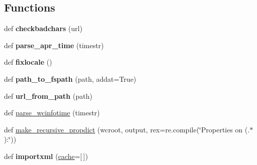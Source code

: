 \subsection*{Functions}
\begin{DoxyCompactItemize}
\item 
\mbox{\label{namespacepy_1_1__path_1_1svnwc_a85706a9a2cd6a80c8ab4f2474d1a0d15}} 
def {\bfseries checkbadchars} (url)
\item 
\mbox{\label{namespacepy_1_1__path_1_1svnwc_acaa85a1e6ef7d13c905de26eaeca9aae}} 
def {\bfseries parse\+\_\+apr\+\_\+time} (timestr)
\item 
\mbox{\label{namespacepy_1_1__path_1_1svnwc_ae25aef9655630780d3357b09e3792d77}} 
def {\bfseries fixlocale} ()
\item 
\mbox{\label{namespacepy_1_1__path_1_1svnwc_ae62f01de04571e31100854efe9e42781}} 
def {\bfseries path\+\_\+to\+\_\+fspath} (path, addat=True)
\item 
\mbox{\label{namespacepy_1_1__path_1_1svnwc_adb4fb6b4bdd3fd4faf269a6da84cb722}} 
def {\bfseries url\+\_\+from\+\_\+path} (path)
\item 
def \hyperlink{namespacepy_1_1__path_1_1svnwc_aabe380627c4211192037554287b229c7}{parse\+\_\+wcinfotime} (timestr)
\item 
def \hyperlink{namespacepy_1_1__path_1_1svnwc_a43a80bcb7d8145c9557c91d0c4b59f10}{make\+\_\+recursive\+\_\+propdict} (wcroot, output, rex=re.\+compile(\char`\"{}Properties on \textquotesingle{}(.$\ast$)\textquotesingle{}\+:\char`\"{}))
\item 
\mbox{\label{namespacepy_1_1__path_1_1svnwc_a0be6b4de52a49d283d071ee09918802e}} 
def {\bfseries importxml} (\hyperlink{classpy_1_1__path_1_1svnwc_1_1cache}{cache}=\mbox{[}$\,$\mbox{]})
\end{DoxyCompactItemize}
